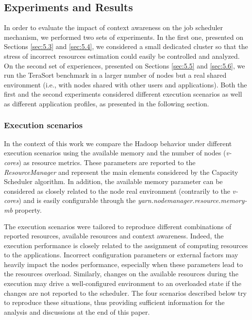 \subsection{Experiments and Results} \label{sec:exper}

In order to evaluate the impact of context awareness on the job scheduler mechanism, we performed two sets of experiments. In the first one, presented on Sections \ref{sec:5.3} and \ref{sec:5.4}, we considered a small dedicated cluster so that the stress of incorrect resources estimation could easily be controlled and analyzed. On the second set of experiences, presented on Sections \ref{sec:5.5} and \ref{sec:5.6}, we run the TeraSort benchmark in a larger number of nodes but a real shared environment (i.e., with nodes shared with other users and applications). Both the first and the second experiments considered different execution scenarios as well as different application profiles, as presented in the following section. 

\subsubsection{Execution scenarios\label{sec:scenarios}}

In the context of this work we compare the Hadoop behavior under different execution scenarios using the available memory and the number of nodes (\textit{v-cores}) as resource metrics. These parameters are reported to the \textit{ResourceManager} and represent the main elements considered by the Capacity Scheduler algorithm. In addition, the available memory parameter can  be considered as closely related to the node real environment (contrarily to the \textit{v-cores}) and is easily configurable through the \textit{yarn.nodemanager.resource.memory-mb} property. 

The execution scenarios were tailored to reproduce different combinations of reported resources, available resources and context awareness. Indeed, the execution performance is closely related to the assignment of computing resources to the applications. Incorrect configuration parameters or external factors may heavily impact the nodes performance, especially when these parameters lead to the resources overload. Similarly, changes on the available resources during the execution may drive a well-configured environment to an overloaded state if the changes are not reported to the scheduler. The four scenarios described below try to reproduce these situations, thus providing sufficient information for the analysis and discussions at the end of this paper. 

